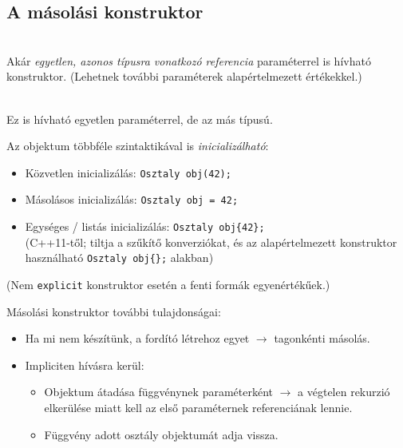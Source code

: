 \documentclass[usenames,dvipsnames,aspectratio=169]{beamer}
\begin{document}
\subsection{A másolási konstruktor}

\begin{frame}
    \begin{description}[m]
        \item[Másolási konstruktor (copy constructor):] \hfill \\ Akár \emph{egyetlen, azonos típusra vonatkozó referencia} paraméterrel is hívható konstruktor. (Lehetnek további paraméterek alapértelmezett értékekkel.)
        \item[Konverziós konstruktor (conversion constructor):] \hfill \\ Ez is hívható egyetlen paraméterrel, de az más típusú.
    \end{description}
    \vfill
    Az objektum többféle szintaktikával is \emph{inicializálható}: \\
    \begin{itemize}
        \item Közvetlen inicializálás: \texttt{Osztaly obj(42);}
        \item Másolásos inicializálás: \texttt{Osztaly obj = 42;}
        \item Egységes / listás inicializálás: \texttt{Osztaly obj\{42\};} \\
        (C++11-től; tiltja a szűkítő konverziókat, és az alapértelmezett konstruktor használható \texttt{Osztaly obj\{\};} alakban)
    \end{itemize}
    \small (Nem \texttt{explicit} konstruktor esetén a fenti formák egyenértékűek.)
\end{frame}

\begin{frame}
    Másolási konstruktor további tulajdonságai:
    \begin{itemize}
        \item Ha mi nem készítünk, a fordító létrehoz egyet $\to$ tagonkénti másolás.
        \item Impliciten hívásra kerül:
            \begin{itemize}
                \item Objektum átadása függvénynek paraméterként $\to$ a végtelen rekurzió elkerülése miatt kell az első paraméternek referenciának lennie.
                \item Függvény adott osztály objektumát adja vissza.
            \end{itemize}
    \end{itemize}
\end{frame}
\end{document}
